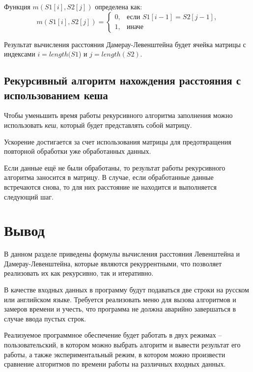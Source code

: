 Функция $m(S1[i], S2[j])$ определена как:
\begin{equation}
\label{eq:m2}
m(S1[i], S2[j]) = \begin{cases}
0, &\text{если $S1[i - 1] = S2[j - 1]$,}\\
1, &\text{иначе}
\end{cases}
\end{equation}

Результат вычисления расстояния Дамерау-Левенштейна будет ячейка матрицы с индексами $i = length(S1$) и $j = length(S2)$.


\subsection{Рекурсивный алгоритм нахождения расстояния с использованием кеша}

Чтобы уменьшить время работы рекурсивного алгоритма заполнения можно использовать \textit{кеш}, который будет представлять собой матрицу.

Ускорение достигается за счет использования матрицы для предотвращения повторной обработки уже обработанных данных.

Если данные ещё не были обработаны, то результат работы рекурсивного алгоритма заносится в матрицу. 
В случае, если обработанные данные встречаются снова, то для них расстояние не находится и выполняется следующий шаг.


\section{Вывод}
В данном разделе приведены формулы вычисления расстояния Левенштейна и Дамерау-Левенштейна, которые являются рекуррентными, что позволяет реализовать их как рекурсивно, так и итеративно.

В качестве входных данных в программу будут подаваться две строки на русском или английском языке. 
Требуется реализовать меню для вызова алгоритмов и замеров времени и учесть, что программа не должна аварийно завершаться в случае ввода пустых строк.

Реализуемое программное обеспечение будет работать в двух режимах -- пользовательский, в котором можно выбрать алгоритм и вывести результат его работы, а также экспериментальный режим, в котором можно произвести сравнение алгоритмов по времени работы на различных входных данных.
